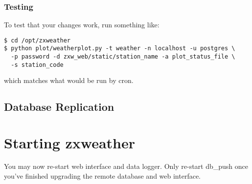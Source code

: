 \documentclass[a4paper,10pt,draft]{book}
\newcommand{\partnumber}{\ifthenelse{\isundefined{\projectnum}}{}{\projectnum-\docnum	\ifthenelse{\equal{\docrev}{001}}{}{.\docrev}}}
\newcommand*\cleartoleftpage{%
  \clearpage
  \ifodd\value{page}\hbox{}\newpage\fi
}
\begin{document}
\subsubsection{Testing}
To test that your changes work, run something like:
\begin{verbatim}
$ cd /opt/zxweather
$ python plot/weatherplot.py -t weather -n localhost -u postgres \
  -p password -d zxw_web/static/station_name -a plot_status_file \
  -s station_code
\end{verbatim}
which matches what would be run by cron.

\subsection{Database Replication}




\section{Starting zxweather}
You may now re-start web interface and data logger. Only re-start db\_push once you've finished upgrading the remote database and web interface.


\cleartoleftpage
\thispagestyle{empty}
\begin{flushright}
\null
\vfill
\tt \partnumber
\end{flushright}
\end{document}
